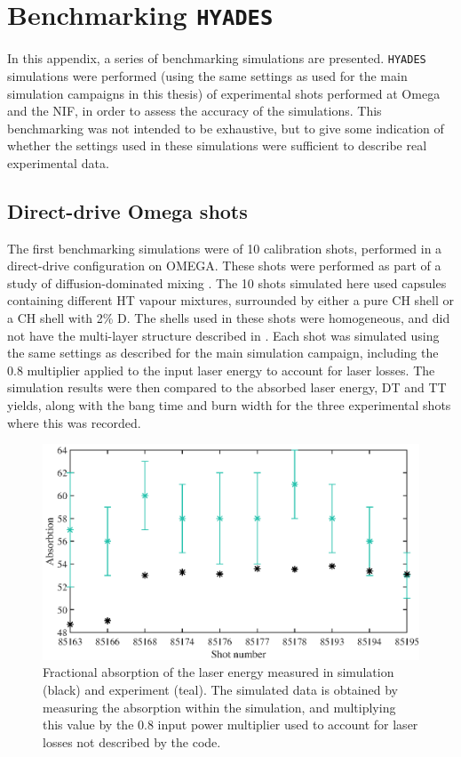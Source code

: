 \chapter{Benchmarking \texttt{HYADES}} \label{app:benchmark}

\minitoc

In this appendix, a series of benchmarking simulations are presented. \texttt{HYADES} simulations were performed (using the same settings as used for the main simulation campaigns in this thesis) of experimental shots performed at Omega and the NIF, in order to assess the accuracy of the simulations. This benchmarking was not intended to be exhaustive, but to give some indication of whether the settings used in these simulations were sufficient to describe real experimental data.

\section{Direct-drive Omega shots}

The first benchmarking simulations were of 10 calibration shots, performed in a direct-drive configuration on OMEGA. These shots were performed as part of a study of diffusion-dominated mixing \cite{Zylstra2018a}. The 10 shots simulated here used capsules containing different HT vapour mixtures, surrounded by either a pure CH shell or a CH shell with 2\% D. The shells used in these shots were homogeneous, and did not have the multi-layer structure described in \cite{Zylstra2018a}. Each shot was simulated using the same settings as described for the main simulation campaign, including the 0.8 multiplier applied to the input laser energy to account for laser losses. The simulation results were then compared to the absorbed laser energy, DT and TT yields, along with the bang time and burn width for the three experimental shots where this was recorded.

\begin{figure}[ht]
\centering
\includegraphics{figures/LowCR/BenchmarkOmegaAbsorbtion.eps}
\caption{Fractional absorption of the laser energy measured in simulation (black) and experiment (teal). The simulated data is obtained by measuring the absorption within the simulation, and multiplying this value by the 0.8 input power multiplier used to account for laser losses not described by the code.}
\label{fig:OmegaAbs}
\end{figure}

